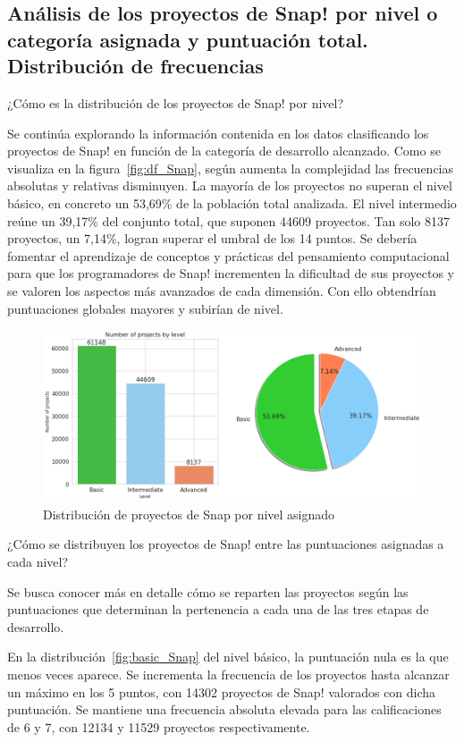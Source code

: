 \documentclass[a4paper, 12pt]{book}
\begin{document}
\subsection{Análisis de los proyectos de Snap! por nivel o categoría asignada y puntuación total. Distribución de frecuencias}
\label{subsec:frec_nivel_Snap}

¿Cómo es la distribución de los proyectos de Snap! por nivel?

Se continúa explorando la información contenida en los datos clasificando los proyectos de Snap! en función de la categoría de desarrollo alcanzado. Como se visualiza en la figura~\ref{fig:df_Snap}, según aumenta la complejidad las frecuencias absolutas y relativas disminuyen. La mayoría de los proyectos no superan el nivel básico, en concreto un 53,69\% de la población total analizada. El nivel intermedio reúne un 39,17\% del conjunto total, que suponen 44609 proyectos. Tan solo 8137 proyectos, un 7,14\%, logran superar el umbral de los 14 puntos. Se debería fomentar el aprendizaje de conceptos y prácticas del pensamiento computacional para que los programadores de Snap! incrementen la dificultad de sus proyectos y se valoren los aspectos más avanzados de cada dimensión. Con ello obtendrían puntuaciones globales mayores y subirían de nivel.

\begin{figure}[H]
    \centering
    \includegraphics[width=.95\textwidth]{img/freq_level_Snap.png}
    \caption{Distribución de proyectos de Snap por nivel asignado}\label{fig:level_Snap}
\end{figure}

¿Cómo se distribuyen los proyectos de Snap! entre las puntuaciones asignadas a cada nivel?

Se busca conocer más en detalle cómo se reparten las proyectos según las puntuaciones que determinan la pertenencia a cada una de las tres etapas de desarrollo.

En la distribución~\ref{fig:basic_Snap} del nivel básico, la puntuación nula es la que menos veces aparece. Se incrementa la frecuencia de los proyectos hasta alcanzar un máximo en los 5 puntos, con 14302 proyectos de Snap! valorados con dicha puntuación. Se mantiene una frecuencia absoluta elevada para las calificaciones de 6 y 7, con 12134 y 11529 proyectos respectivamente.
\end{document}
